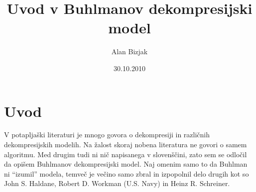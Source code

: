 \documentclass[a4paper]{article}
\author {Alan Bizjak}
\title {Uvod v Buhlmanov dekompresijski model}
\date{30.10.2010}
\begin{document}
\maketitle

\section{Uvod}

V potapljaški literaturi je mnogo govora o dekompresiji in
različnih dekompresijskih modelih. Na žalost skoraj nobena
literatura ne govori o samem algoritmu. Med drugim tudi ni nič
napisanega v slovenščini, zato sem se odločil da opišem
Buhlmanov dekompresijski model. Naj omenim samo to da Buhlman ni
``izumil'' modela, temveč je večino samo zbral in izpopolnil
delo drugih kot so John S. Haldane, Robert D. Workman (U.S. Navy) in
Heinz R. Schreiner.
\end{document}
